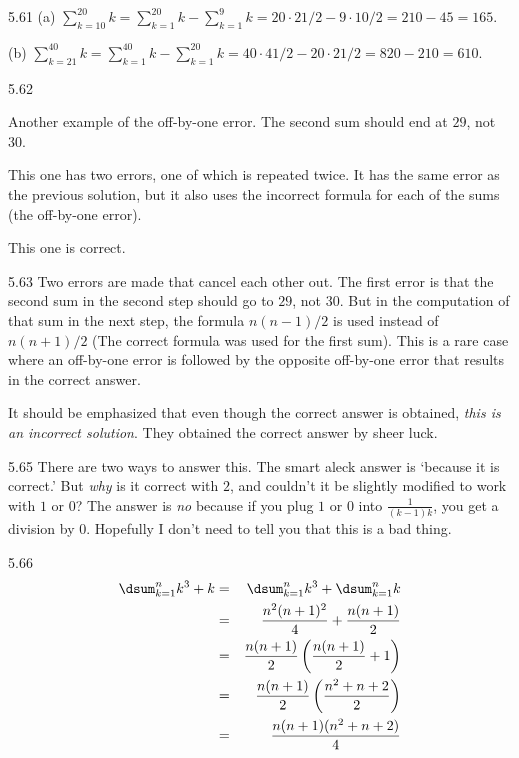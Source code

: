 \begin{Answer}{5.61}
(a) ${\displaystyle \sum_{k=10}^{20} k
=\sum_{k=1}^{20} k - \sum_{k=1}^{9} k
=20\cdot 21/2 - 9\cdot 10/2 = 210 - 45 = 165}$.

(b) ${\displaystyle \sum_{k=21}^{40} k
=\sum_{k=1}^{40} k - \sum_{k=1}^{20} k
=40\cdot 41/2 - 20\cdot 21/2 = 820-210 = 610}.$
\end{Answer}
\begin{Answer}{5.62}
\begin{solevalenum}
\item
Another example of the off-by-one error.
The second sum should end at $29$, not $30$.
\item
This one has two errors, one of which is repeated twice.
It has the same error as the previous solution, but it also uses
the incorrect formula for each of the sums (the off-by-one error).
\item
This one is correct.
\end{solevalenum}
\end{Answer}
\begin{Answer}{5.63}
Two errors are made that cancel each other out.
The first error is that the second sum in the second step should go to $29$, not $30$.
But in the computation of that sum in the next step,
the formula $n(n-1)/2$ is used instead of $n(n+1)/2$
(The correct formula was used for the first sum).
This is a rare case where an off-by-one error is followed by the opposite off-by-one error
that results in the correct answer.

It should be emphasized that even though the correct answer is obtained,
{\em this is an incorrect solution}.
They obtained the correct answer by sheer luck.
\end{Answer}
\begin{Answer}{5.65}
There are two ways to answer this.  The smart aleck answer is `because it is correct.'
But {\em why} is it correct with $2$, and couldn't it be slightly modified to work with $1$ or $0$?
The answer is {\em no} because if you plug $1$ or $0$ into $\frac{1}{(k-1)k}$,
you get a division by $0$.  Hopefully I don't need to tell you that this is a bad thing.
\end{Answer}
\begin{Answer}{5.66}
\begin{eqnarray*}
\dsum _{k=1}^n k^3+k &=& \dsum _{k=1}^n k^3+ \dsum _{k=1}^n k\\
&=&\frac{n^2(n+1)^2}{4}+\frac{n(n+1)}{2}\\
&=&\frac{n(n+1)}{2}\left(\frac{n(n+1)}{2}+1\right)\\
&=&\frac{n(n+1)}{2}\left(\frac{n^2+n+2}{2}\right)\\
&=&\frac{n(n+1)(n^2+n+2)}{4}
\end{eqnarray*}
\end{Answer}
